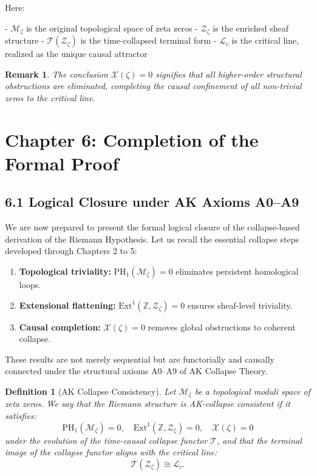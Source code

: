 \documentclass[11pt]{article}
\newtheorem{definition}[theorem]{Definition}
\newtheorem{remark}[theorem]{Remark}
\newcommand{\Sha}{\mathcal{X}}
\begin{document}
Here:

- $\mathcal{M}_\zeta$ is the original topological space of zeta zeros
- $\mathcal{Z}_\zeta$ is the enriched sheaf structure
- $\mathcal{T}(\mathcal{Z}_\zeta)$ is the time-collapsed terminal form
- $\mathcal{L}_c$ is the critical line, realized as the unique causal attractor

\begin{remark}
The conclusion $\Sha(\zeta) = 0$ signifies that all higher-order structural obstructions are eliminated,  
completing the causal confinement of all non-trivial zeros to the critical line.
\end{remark}



\section{Chapter 6: Completion of the Formal Proof}

\subsection{6.1 Logical Closure under AK Axioms A0–A9}

We are now prepared to present the formal logical closure of the collapse-based derivation of the Riemann Hypothesis.  
Let us recall the essential collapse steps developed through Chapters 2 to 5:

\begin{enumerate}
    \item \textbf{Topological triviality:} $\mathrm{PH}_1(\mathcal{M}_\zeta) = 0$ eliminates persistent homological loops.
    \item \textbf{Extensional flattening:} $\mathrm{Ext}^1(\mathbb{Z}, \mathcal{Z}_\zeta) = 0$ ensures sheaf-level triviality.
    \item \textbf{Causal completion:} $\Sha(\zeta) = 0$ removes global obstructions to coherent collapse.
\end{enumerate}

These results are not merely sequential but are functorially and causally connected under the structural axioms A0–A9 of AK Collapse Theory.

\begin{definition}[AK Collapse Consistency]
Let $\mathcal{M}_\zeta$ be a topological moduli space of zeta zeros.  
We say that the Riemann structure is AK-collapse consistent if it satisfies:
\[
\mathrm{PH}_1(\mathcal{M}_\zeta) = 0,\quad \mathrm{Ext}^1(\mathbb{Z}, \mathcal{Z}_\zeta) = 0,\quad \Sha(\zeta) = 0
\]
under the evolution of the time-causal collapse functor $\mathcal{T}$, and that the terminal image of the collapse functor aligns with the critical line:
\[
\mathcal{T}(\mathcal{Z}_\zeta) \cong \mathcal{L}_c.
\]
\end{definition}
\end{document}
